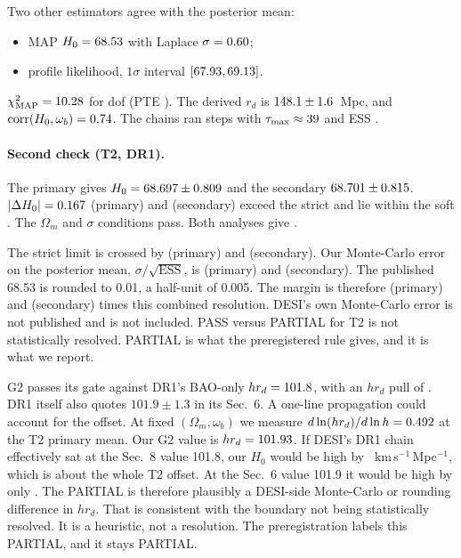 \documentclass[11pt]{article}
\begin{document}
Two other estimators agree with the posterior mean:
\begin{itemize}
\item MAP $H_0=68.53$ with Laplace $\sigma=0.60$;
\item profile likelihood, $1\sigma$ interval $[67.93,69.13]$.
\end{itemize}
$\chi^2_\mathrm{MAP}=10.28$ for \PTOneDof{} dof (PTE \PTOnePte).
The derived $r_d$ is $148.1\pm1.6$~Mpc, and $\mathrm{corr}(H_0,\omega_b)=0.74$. The chains
ran \PTOneSteps{} steps with $\tau_\mathrm{max}\approx39$ and
ESS \PTOneEss.

\paragraph{Second check (T2, DR1).}\label{sec:t2}
The primary gives $H_0=68.697\pm0.809$ and the secondary
$68.701\pm0.815$. $|\Delta H_0|=0.167$ (primary) and
\STTwoDH{} (secondary) exceed the strict \TolStrict{} and lie within the
soft \TolSoft. The $\Omega_m$ and $\sigma$ conditions pass. Both analyses
give \textbf{\PTTwoVerdict}.

The strict limit is crossed by \TTwoMarginP{} (primary) and \TTwoMarginS{}
(secondary). Our Monte-Carlo error on the posterior mean,
$\sigma/\sqrt{\mathrm{ESS}}$, is \TTwoMcP{} (primary) and \TTwoMcS{}
(secondary). The published 68.53 is rounded to 0.01, a half-unit of 0.005.
The margin is therefore \TTwoResRatioP{} (primary) and \TTwoResRatioS{}
(secondary) times this combined resolution. DESI's own Monte-Carlo error
is not published and is not included. PASS versus PARTIAL for T2 is not
statistically resolved. PARTIAL is what the preregistered rule gives, and
it is what we report.

G2 passes its gate against DR1's BAO-only $h r_d=101.8$, with an
$h r_d$ pull of \GTwoPullHrd. DR1 itself also quotes $101.9\pm1.3$ in its
Sec.~6. A one-line propagation could account for the offset. At fixed
$(\Omega_m,\omega_b)$ we measure
$d\ln(h r_d)/d\ln h=0.492$ at the T2 primary mean. Our G2 value is
$h r_d=101.93$. If DESI's DR1 chain effectively sat at the Sec.~8 value
101.8, our $H_0$ would be high by \PropEight~km\,s$^{-1}$\,Mpc$^{-1}$,
which is about the whole T2 offset. At the Sec.~6 value 101.9 it would be
high by only \PropNine. The PARTIAL is therefore plausibly a DESI-side
Monte-Carlo or rounding difference in $h r_d$. That is consistent with the
boundary not being statistically resolved. It is a heuristic, not a
resolution. The preregistration labels this PARTIAL, and it stays PARTIAL.
\end{document}
